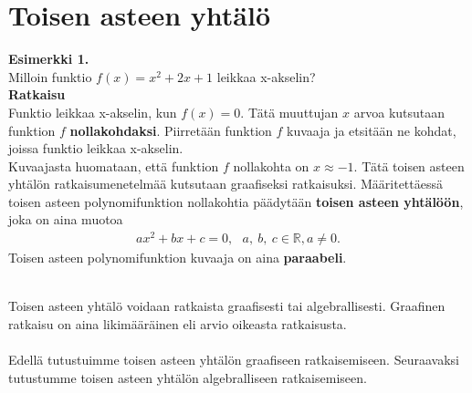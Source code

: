 \chapter{Toisen asteen yhtälö}
\textbf{Esimerkki 1.} \\
Milloin funktio $f(x)=x^2+2x+1$ leikkaa x-akselin? \\ 
\textbf{Ratkaisu} \\
Funktio leikkaa x-akselin, kun $f(x)=0$. Tätä muuttujan $x$ arvoa kutsutaan funktion $f$ \textbf{nollakohdaksi}. Piirretään funktion $f$ kuvaaja ja etsitään ne kohdat, joissa funktio leikkaa x-akselin. %
\missingfigure \\
Kuvaajasta huomataan, että funktion $f$ nollakohta on $x \approx -1$. Tätä toisen asteen yhtälön ratkaisumenetelmää kutsutaan graafiseksi ratkaisuksi.
Määritettäessä toisen asteen polynomifunktion nollakohtia päädytään \textbf{toisen asteen yhtälöön}, joka on aina muotoa
\begin{align*}
ax^2+bx+c=0, \ \ \ a, \ b, \ c  \in \mathbb{R}, a \neq 0.
\end{align*}
Toisen asteen polynomifunktion kuvaaja on aina \textbf{paraabeli}. \\
\missingfigure \\

Toisen asteen yhtälö voidaan ratkaista graafisesti tai algebrallisesti. Graafinen ratkaisu on aina likimääräinen eli arvio oikeasta ratkaisusta. \\ \\ Edellä tutustuimme toisen asteen yhtälön graafiseen ratkaisemiseen. Seuraavaksi tutustumme toisen asteen yhtälön algebralliseen ratkaisemiseen.

